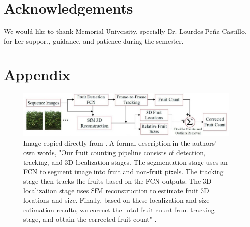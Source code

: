 \documentclass[twocolumn]{bmcart}%
\begin{document}
\begin{backmatter}

\section*{Acknowledgements}
We would like to thank Memorial University, specially Dr. Lourdes Peña-Castillo, for her support, guidance, and patience during the semester.  







\pagebreak
\onecolumn
\section*{Appendix}

\begin{figure}[H]
 \begin{center} 
  \includegraphics[width=\textwidth]{Kumar2019_crop_yields2.JPG}
  \caption{Image copied directly from \cite{Kumar2018}. A formal description in the authors' own words, "Our fruit counting pipeline consists of detection, tracking, and 3D localization stages. The segmentation stage uses an FCN to segment image into fruit and non-fruit pixels. The tracking stage then tracks the fruits based on the FCN outputs. The 3D localization stage uses SfM reconstruction to estimate fruit 3D locations and size. Finally, based on these localization and size estimation results, we correct the total fruit count from tracking stage, and obtain the corrected fruit count" \cite{Kumar2018}.}
  \end{center}
\end{figure}



\end{backmatter}
\end{document}

